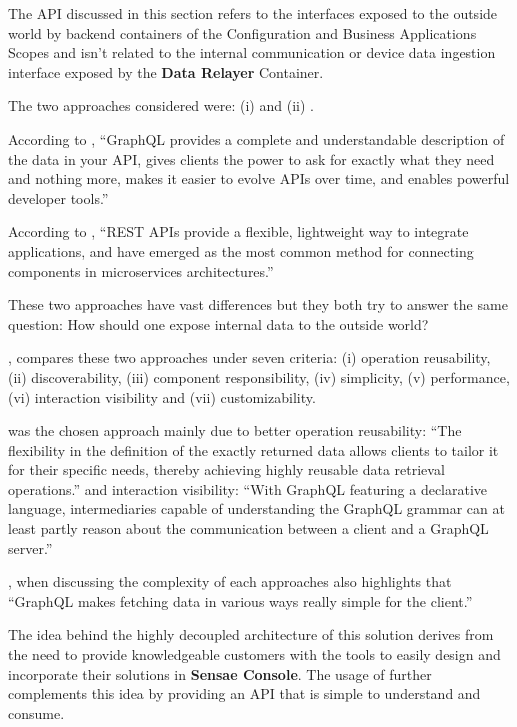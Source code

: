 The \gls{API} discussed in this section refers to the interfaces exposed to the outside world by backend containers of the Configuration and Business Applications Scopes and isn't related to the internal communication or device data ingestion interface exposed by the \textbf{Data Relayer} Container.

The two approaches considered were: (i)  and (ii) .

According to \cite{graphql}, ``GraphQL provides a complete and understandable description of the data in your API, gives clients the power to ask for exactly what they need and nothing more, makes it easier to evolve APIs over time, and enables powerful developer tools.''

According to \cite{rest}, ``REST APIs provide a flexible, lightweight way to integrate applications, and have emerged as the most common method for connecting components in microservices architectures.''

These two approaches have vast differences but they both try to answer the same question: How should one expose internal data to the outside world?

\cite{eizinger2017api}, compares these two approaches under seven criteria: (i) operation reusability, (ii) discoverability, (iii) component responsibility, (iv) simplicity, (v) performance, (vi) interaction visibility and (vii) customizability.

 was the chosen approach mainly due to better operation reusability: ``The flexibility in the definition of the exactly returned data allows clients to tailor it for their specific needs, thereby achieving highly reusable data retrieval operations.'' and interaction visibility: ``With GraphQL featuring a declarative language, intermediaries capable of understanding the GraphQL grammar can at least partly reason about the communication between a client and a GraphQL server.''

\cite{eizinger2017api}, when discussing the complexity of each approaches also highlights that ``GraphQL makes fetching data in various ways really simple for the client.''

The idea behind the highly decoupled architecture of this solution derives from the need to provide knowledgeable customers with the tools to easily design and incorporate their solutions in \textbf{Sensae Console}. The usage of  further complements this idea by providing an API that is simple to understand and consume.

